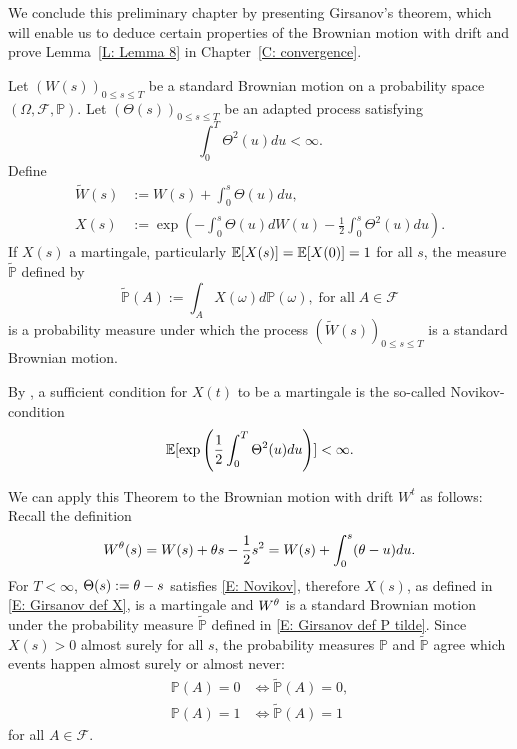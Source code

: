 We conclude this preliminary chapter by presenting Girsanov's theorem,
which will enable us to deduce certain properties of the Brownian motion with drift
and prove Lemma~\ref{L: Lemma 8} in Chapter~\ref{C: convergence}.

\begin{theorem} \label{T: Girsanov}
	Let $(W(s))_{0 \leq s \leq T}$ be a standard Brownian motion on a probability space $(\Omega, \mathcal{F}, \mathbb{P})$.
	Let $(\Theta(s))_{0 \leq s \leq T}$ be an adapted process satisfying
	\begin{equation} \label{E: Girsanov cond Theta}
	\int_{0}^{T} \Theta^2(u)du < \infty.
	\end{equation}
	Define
	\begin{align}
	\tilde{W}(s) &:= W(s) + \int_0^s \Theta(u)du, \label{E: Girsanov def W tilde} \\ 
	X(s) &:=  \exp\left( -\int_{0}^{s} \Theta(u) dW(u) - \frac{1}{2} \int_0^s \Theta^2(u)du \right). \label{E: Girsanov def X}
	\end{align}
	If $X(s)$ a martingale, particularly $\mathbb{E}[X(s)] = \mathbb{E}[X(0)] = 1$ for all $s$,
	the measure $\tilde{\mathbb{P}}$ defined by
	\begin{equation} \label{E: Girsanov def P tilde}
	\tilde{\mathbb{P}}(A) := \int_A X(\omega) d\mathbb{P}(\omega), \; \text{for all} \; A \in \mathcal{F}
	\end{equation}
	is a probability measure under which the process 
	$(\tilde{W}(s))_{0 \leq s \leq T}$
	is a standard Brownian motion.
\end{theorem}

By \cite[Remark 4.2.3, p.66]{Lamberton.2000}, a sufficient condition for $X(t)$ to be a martingale is the so-called Novikov-condition
\begin{equation} \label{E: Novikov}
\mathbb{E}[ \exp \left( \frac{1}{2} \int_{0}^{T} \Theta^2(u)du \right) ] < \infty.
\end{equation}

We can apply this Theorem to the Brownian motion with drift $W^t$ as follows:
Recall the definition
\begin{equation}
W^{\theta}(s) = W(s) + \theta s - \frac{1}{2} s^2 = W(s) + \int_0^s (\theta-u)du.
\end{equation}
For $T<\infty$, $\Theta(s) := \theta-s$ satisfies \eqref{E: Novikov},
therefore $X(s)$, as defined in \eqref{E: Girsanov def X}, is a martingale and
$W^{\theta}$ is a standard Brownian motion under the probability measure $\tilde{\mathbb{P}}$ defined in \eqref{E: Girsanov def P tilde}.
Since $X(s) > 0$ almost surely for all $s$, 
the probability measures $\mathbb{P}$ and $\tilde{\mathbb{P}}$ agree which events happen almost surely or almost never:
\begin{equation} \label{E: P0 = Q0}
\begin{aligned}
\mathbb{P}(A) = 0 &\iff \tilde{\mathbb{P}}(A) = 0, \\
\mathbb{P}(A) = 1 &\iff \tilde{\mathbb{P}}(A) = 1
\end{aligned}
\end{equation}
for all $A \in \mathcal{F}$.

